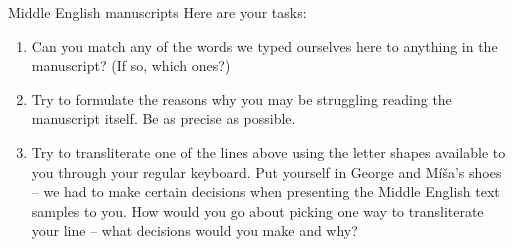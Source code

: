\begin{exercises}{Middle English manuscripts}
\noindent Here are your tasks:
\begin{enumerate}
    \item Can you match any of the words we typed ourselves here to anything in the manuscript? (If so, which ones?)
    \item Try to formulate the reasons why you may be struggling reading the manuscript itself. Be as precise as possible.
    \item Try to transliterate one of the lines above using the letter shapes available to you through your regular keyboard. Put yourself in George and Mí\v{s}a's shoes -- we had to make certain decisions when presenting the Middle English text samples to you. How would you go about picking one way to transliterate your line -- what decisions would you make and why?
\end{enumerate}


\end{exercises}

